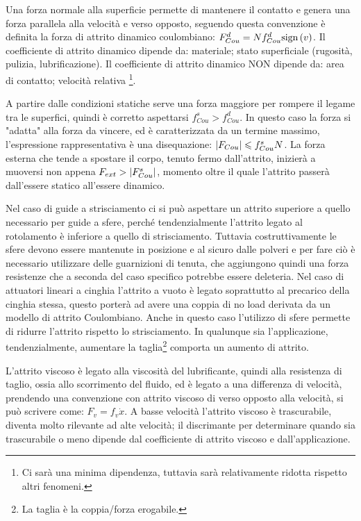 Una forza normale alla superficie permette di mantenere il contatto e genera una forza parallela alla velocità e verso opposto, seguendo questa convenzione è definita la forza di attrito dinamico coulombiano: $F_{Cou}^d = N f_{Cou}^d \textup{sign}\left(v\right)$.
Il coefficiente di attrito dinamico dipende da: materiale; stato superficiale (rugosità, pulizia, lubrificazione).
Il coefficiente di attrito dinamico NON dipende da: area di contatto; velocità relativa \footnote{Ci sarà una minima dipendenza, tuttavia sarà relativamente ridotta rispetto altri fenomeni.}.

A partire dalle condizioni statiche serve una forza maggiore per rompere il legame tra le superfici, quindi è corretto aspettarsi $f_{Cou}^s>f_{Cou}^d$. In questo caso la forza si "adatta" alla forza da vincere, ed è caratterizzata da un termine massimo, l'espressione rappresentativa è una disequazione: $\left|F_{Cou}\right| \leqslant f_{Cou}^s N$.
La forza esterna che tende a spostare il corpo, tenuto fermo dall'attrito, inizierà a muoversi non appena $F_{ext}>\left|F_{Cou}^s\right|$, momento oltre il quale l'attrito passerà dall'essere statico all'essere dinamico.

Nel caso di guide a strisciamento ci si può aspettare un attrito superiore a quello necessario per guide a sfere, perché tendenzialmente l'attrito legato al rotolamento è inferiore a quello di strisciamento.
Tuttavia costruttivamente le sfere devono essere mantenute in posizione e al sicuro dalle polveri e per fare ciò è necessario utilizzare delle guarnizioni di tenuta, che aggiungono quindi una forza resistenze che a seconda del caso specifico potrebbe essere deleteria.
Nel caso di attuatori lineari a cinghia l'attrito a vuoto è legato soprattutto al precarico della cinghia stessa, questo porterà ad avere una coppia di no load derivata da un modello di attrito Coulombiano. Anche in questo caso l'utilizzo di sfere permette di ridurre l'attrito rispetto lo strisciamento.
In qualunque sia l'applicazione, tendenzialmente, aumentare la taglia\footnote{La taglia è la coppia/forza erogabile.} comporta un aumento di attrito.

L'attrito viscoso è legato alla viscosità del lubrificante, quindi alla resistenza di taglio, ossia allo scorrimento del fluido, ed è legato a una differenza di velocità, prendendo una convenzione con attrito viscoso di verso opposto alla velocità, si può scrivere come: $F_v=f_v \dot{x}$.
A basse velocità l'attrito viscoso è trascurabile, diventa molto rilevante ad alte velocità; il discrimante per determinare quando sia trascurabile o meno dipende dal coefficiente di attrito viscoso e dall'applicazione.